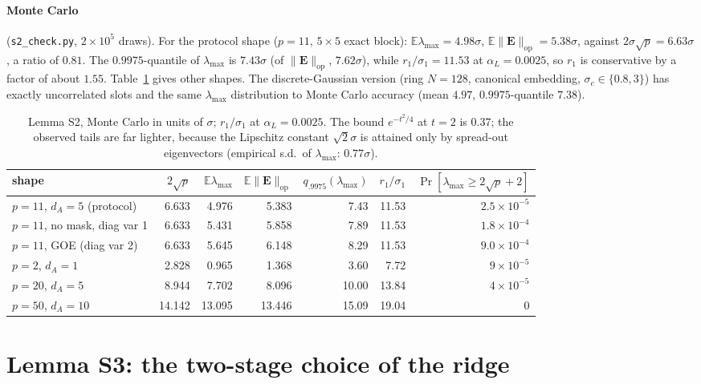 \documentclass[11pt]{article}
\theoremstyle{definition}
\theoremstyle{plain}
\newcommand{\Ex}{\mathbb{E}}
\newcommand{\bE}{\mathbf{E}}
\newcommand{\lmax}{\lambda_{\max}}
\newcommand{\op}{\mathrm{op}}
\begin{document}
\paragraph{Monte Carlo} (\texttt{s2\_check.py}, $2\times10^5$ draws). For the protocol shape ($p=11$, $5\times5$ exact block): $\Ex\lmax=4.98\sigma$, $\Ex\|\bE\|_\op=5.38\sigma$, against $2\sigma\sqrt p=6.63\sigma$, a ratio of $0.81$. The $0.9975$-quantile of $\lmax$ is $7.43\sigma$ (of $\|\bE\|_\op$, $7.62\sigma$), while $r_1/\sigma_1=11.53$ at $\alpha_L=0.0025$, so $r_1$ is conservative by a factor of about $1.55$. Table~\ref{tab:S2num} gives other shapes. The discrete-Gaussian version (ring $N=128$, canonical embedding, $\sigma_c\in\{0.8,3\}$) has exactly uncorrelated slots and the same $\lmax$ distribution to Monte Carlo accuracy (mean $4.97$, $0.9975$-quantile $7.38$).

\begin{table}[h]
\centering\small
\setlength{\tabcolsep}{4pt}
\begin{tabular}{@{}lrrrrrr@{}}
\toprule
shape & $2\sqrt p$ & $\Ex\lmax$ & $\Ex\|\bE\|_\op$ & $q_{.9975}(\lmax)$ & $r_1/\sigma_1$ & $\Pr[\lmax\ge2\sqrt p+2]$ \\
\midrule
$p=11$, $d_A=5$ (protocol) & 6.633 & 4.976 & 5.383 & 7.43 & 11.53 & $2.5\times10^{-5}$ \\
$p=11$, no mask, diag var 1 & 6.633 & 5.431 & 5.858 & 7.89 & 11.53 & $1.8\times10^{-4}$ \\
$p=11$, GOE (diag var 2) & 6.633 & 5.645 & 6.148 & 8.29 & 11.53 & $9.0\times10^{-4}$ \\
$p=2$, $d_A=1$ & 2.828 & 0.965 & 1.368 & 3.60 & 7.72 & $9\times10^{-5}$ \\
$p=20$, $d_A=5$ & 8.944 & 7.702 & 8.096 & 10.00 & 13.84 & $4\times10^{-5}$ \\
$p=50$, $d_A=10$ & 14.142 & 13.095 & 13.446 & 15.09 & 19.04 & $0$ \\
\bottomrule
\end{tabular}
\caption{Lemma S2, Monte Carlo in units of $\sigma$; $r_1/\sigma_1$ at $\alpha_L=0.0025$. The bound $e^{-t^2/4}$ at $t=2$ is $0.37$; the observed tails are far lighter, because the Lipschitz constant $\sqrt2\sigma$ is attained only by spread-out eigenvectors (empirical s.d.\ of $\lmax$: $0.77\sigma$).}
\label{tab:S2num}
\end{table}

\section{Lemma S3: the two-stage choice of the ridge}
\label{sec:S3}
\end{document}
